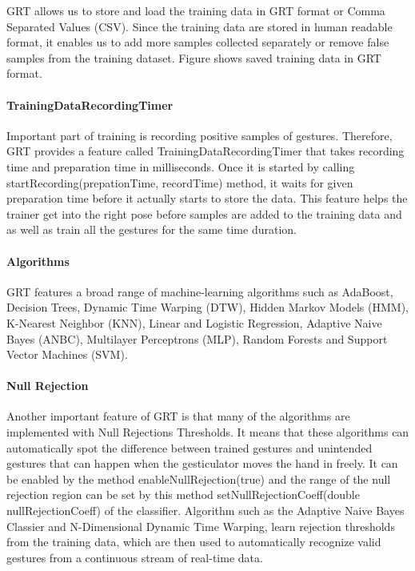 GRT allows us to store and load the training data in GRT format or Comma Separated Values (CSV). Since the training data are stored in human readable format, it enables us to add more samples collected separately or remove false samples from the training dataset. Figure shows saved training data in GRT format.

\paragraph*{TrainingDataRecordingTimer} Important part of training is recording positive samples of gestures. Therefore, GRT provides a feature called TrainingDataRecordingTimer that takes recording time and preparation time in milliseconds. Once it is started by calling startRecording(prepationTime, recordTime) method, it waits for given preparation time before it actually starts to store the data. This feature helps the trainer get into the right pose before samples are added to the training data and as well as train all the gestures for the same time duration.

\paragraph*{Algorithms} GRT features a broad range of machine-learning algorithms such as AdaBoost, Decision Trees, Dynamic Time Warping (DTW), Hidden Markov Models (HMM), K-Nearest Neighbor (KNN), Linear and Logistic Regression, Adaptive Naive Bayes (ANBC), Multilayer Perceptrons (MLP), Random Forests and Support Vector Machines (SVM). 

\paragraph*{Null Rejection} Another important feature of GRT is that many of the algorithms are implemented with Null Rejections Thresholds. It means that these algorithms can automatically spot the difference between trained gestures and unintended gestures that can happen when the gesticulator moves the hand in freely. It can be enabled by the method enableNullRejection(true) and the range of the null rejection region can be set by this method setNullRejectionCoeff(double nullRejectionCoeff) of the classifier. Algorithm such as the Adaptive Naive Bayes Classier and N-Dimensional Dynamic Time Warping, learn rejection thresholds from the training data, which are then used to automatically recognize valid gestures from a continuous stream of real-time data.

